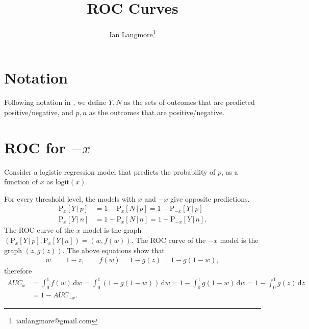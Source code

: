 \documentclass[12pt]{article}
\def \dw { \, \mbox{d}w}
\def \dz { \,\mbox{d}z}
\def \rmP {\mathrm{P}}
\def \logit { {\mbox{logit}}}
\def \g { {\,|\,}}
\theoremstyle{definition}
\theoremstyle{remark}
\begin{document}
\title{ROC Curves}
\author[1]{Ian Langmore\thanks{ianlangmore@gmail.com}}
\maketitle

\tableofcontents
\abstract{}


\medskip


\section{Notation}
Following notation in \cite{FawROC}, we define $Y,N$ as the sets of outcomes that are predicted positive/negative, and $p, n$ as the outcomes that are positive/negative.


\section{ROC for $-x$}
Consider a logistic regression model that predicts the probability of $p$, as a function of $x$ as $\logit(x)$.  

For every threshold level, the models with $x$ and $-x$ give opposite predictions.
\begin{align*}
  \rmP_x[Y\g p] &= 1 - \rmP_x[N\g p] = 1 - \rmP_{-x}[Y\g p]\\
  \rmP_x[Y\g n] &= 1 - \rmP_x[N\g n] = 1 - \rmP_{-x}[Y\g n].
\end{align*}
The ROC curve of the $x$ model is the graph $(\rmP_{x}[Y\g p], \rmP_{x}[Y\g n]) = (w, f(w))$.  The ROC curve of the $-x$ model is the graph $(z, g(z))$.  The above equations show that
\begin{align*}
 w &= 1-z, \qquad f(w) = 1 - g(z) = 1 - g(1-w), 
\end{align*}
therefore
\begin{align*}
  AUC_x &= \int_0^1 f(w)\dw = \int_0^1 \left( 1 - g(1-w) \right)\dw = 1 - \int_0^1 g(1-w)\dw = 1 - \int_0^1 g(z)\dz\\
  &= 1 - AUC_{-x}.
\end{align*}
 


\end{document}
